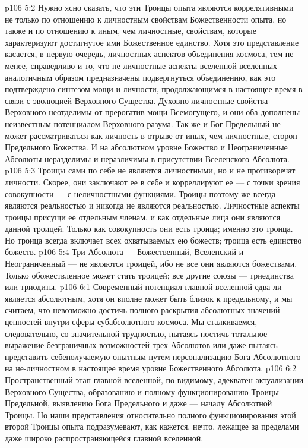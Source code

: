 \vs p106 5:2 Нужно ясно сказать, что эти Троицы опыта являются коррелятивными не только по отношению к личностным свойствам Божественности опыта, но также и по отношению к иным, чем личностные, свойствам, которые характеризуют достигнутое ими Божественное единство. Хотя это представление касается, в первую очередь, личностных аспектов объединения космоса, тем не менее, справедливо и то, что не\hyp{}личностные аспекты вселенной вселенных аналогичным образом предназначены подвергнуться объединению, как это подтверждено синтезом мощи и личности, продолжающимся в настоящее время в связи с эволюцией Верховного Существа. Духовно\hyp{}личностные свойства Верховного неотделимы от прерогатив мощи Всемогущего, и они оба дополнены неизвестным потенциалом Верховного разума. Так же и Бог Предельный не может рассматриваться как личность в отрыве от иных, чем личностные, сторон Предельного Божества. И на абсолютном уровне Божество и Неограниченные Абсолюты неразделимы и неразличимы в присутствии Вселенского Абсолюта.
\vs p106 5:3 Троицы сами по себе не являются личностными, но и не противоречат личности. Скорее, они заключают ее в себе и корреллируют ее --- с точки зрения совокупности --- с неличностными функциями. Троицы поэтому же всегда являются  реальностью и никогда не являются  реальностью. Личностные аспекты троицы присущи ее отдельным членам, и как отдельные лица они  являются данной троицей. Только как совокупность они есть троица; именно это  троица. Но троица всегда включает всех охватываемых ею божеств; троица есть единство божеств.
\vs p106 5:4 Три Абсолюта --- Божественный, Вселенский и Неограниченный --- не являются троицей, ибо не все они являются божествами. Только обожествленное может стать троицей; все другие союзы --- триединства или триодиты.
\vs p106 6:1 Современный потенциал главной вселенной едва ли является абсолютным, хотя он вполне может быть близок к предельному, и мы считаем, что невозможно достичь полного раскрытия абсолютных значений\hyp{}ценностей внутри сферы субабсолютного космоса. Мы сталкиваемся, следовательно, со значительной трудностью, пытаясь постичь тотальное выражение безграничных возможностей трех Абсолютов или даже пытаясь представить себеполучаемую опытным путем персонализацию Бога Абсолютного на не\hyp{}личностном в настоящее время уровне Божественного Абсолюта.
\vs p106 6:2 Пространственный этап главной вселенной, по\hyp{}видимому, адекватен актуализации Верховного Существа, образованию и полному функционированию Троицы Предельной, выявлению Бога Предельного и даже --- началу Абсолютной Троицы. Но наши представления относительно полного функционирования этой второй Троицы опыта подразумевают, как кажется, нечто, лежащее за пределами даже широко распространяющейся главной вселенной.
